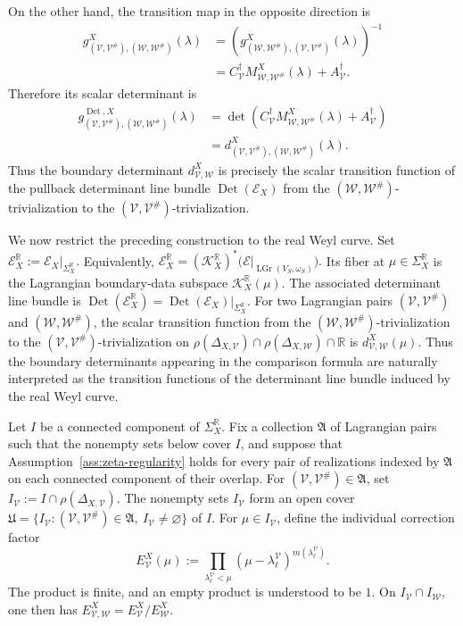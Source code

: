 \documentclass[12pt]{amsart}
\theoremstyle{plain}
\theoremstyle{definition}
\theoremstyle{remark}
\numberwithin{equation}{section} \numberwithin{figure}{section}
\newcommand{\mb}[1]{\mathbb{#1}} %
\newcommand{\mc}[1]{\mathcal{#1}}
\begin{document}
On the other hand, the transition map in the opposite direction is
\[
\begin{aligned}
    g_{(\mc V,\mc V^\#),(\mc W,\mc W^\#)}^X(\lambda)
    &=
    \left(
        g_{(\mc W,\mc W^\#),(\mc V,\mc V^\#)}^X(\lambda)
    \right)^{-1} \\
    &=
    C_{\mc V}^{\dagger}
    M_{\mc W,\mc W^\#}^X(\lambda)
    +
    A_{\mc V}^{\dagger}.
\end{aligned}
\]
Therefore its scalar determinant is
\[
\begin{aligned}
    g_{(\mc V,\mc V^\#),(\mc W,\mc W^\#)}
    ^{\operatorname{Det},X}(\lambda)
    &=
    \det\!\left(
        C_{\mc V}^{\dagger}
        M_{\mc W,\mc W^\#}^X(\lambda)
        +
        A_{\mc V}^{\dagger}
    \right) \\
    &=
    d_{(\mc V,\mc V^\#),(\mc W,\mc W^\#)}^X(\lambda).
\end{aligned}
\]
Thus the boundary determinant \(d_{\mc V,\mc W}^X\) is precisely the
scalar transition function of the pullback determinant line bundle
\(\operatorname{Det}(\mc E_X)\) from the
\((\mc W,\mc W^\#)\)-trivialization to the
\((\mc V,\mc V^\#)\)-trivialization.

We now restrict the preceding construction to the real Weyl curve.
Set
\(
    \mc E_X^{\mb R}
    :=
    \mc E_X|_{\Sigma_X^{\mb R}}.
\)
Equivalently,
\(
    \mc E_X^{\mb R}
    =
    (\mc K_X^{\mb R})^*
    \bigl(
        \mc E|_{\operatorname{LGr}(V_S,\omega_S)}
    \bigr).
\)
Its fiber at
\(\mu\in\Sigma_X^{\mb R}\) is the Lagrangian boundary-data subspace
\(\mc K_X^{\mb R}(\mu)\). The associated determinant line bundle is
\(
    \operatorname{Det}(\mc E_X^{\mb R})
    =
    \operatorname{Det}(\mc E_X)|_{\Sigma_X^{\mb R}}.
\)
For two Lagrangian pairs
\((\mc V,\mc V^\#)\) and \((\mc W,\mc W^\#)\), the scalar transition
function from the \((\mc W,\mc W^\#)\)-trivialization to the
\((\mc V,\mc V^\#)\)-trivialization on
\(
    \rho(\Delta_{X,\mc V})
    \cap
    \rho(\Delta_{X,\mc W})
    \cap
    \mb R
\)
is \(d_{\mc V,\mc W}^X(\mu)\). Thus the boundary determinants
appearing in the comparison formula are naturally interpreted as the
transition functions of the determinant line bundle induced by the
real Weyl curve.

Let \(I\) be a connected component of \(\Sigma_X^{\mb R}\). Fix a
collection \(\mathfrak A\) of Lagrangian pairs such that the nonempty
sets below cover \(I\), and suppose that
Assumption~\ref{ass:zeta-regularity} holds for every pair of
realizations indexed by \(\mathfrak A\) on each connected component
of their overlap. For \((\mc V,\mc V^\#)\in\mathfrak A\), set
\(
    I_{\mc V}:=I\cap\rho(\Delta_{X,\mc V}).
\)
The nonempty sets \(I_{\mc V}\) form an open cover
\(
\mathfrak U=
\{I_{\mc V}:(\mc V,\mc V^\#)\in\mathfrak A,\
I_{\mc V}\neq\varnothing\}
\)
of \(I\).
For \(\mu\in I_{\mc V}\), define the individual correction factor
\[
    E_{\mc V}^X(\mu)
    :=
    \prod_{\lambda_\ell^{\mc V}<\mu}
    (\mu-\lambda_\ell^{\mc V})^{m(\lambda_\ell^{\mc V})}.
\]
The product is finite, and an empty product is understood to be
\(1\). On \(I_{\mc V}\cap I_{\mc W}\), one then has
\(
    E_{\mc V,\mc W}^X
    =
    E_{\mc V}^X/E_{\mc W}^X.
\)
\end{document}
